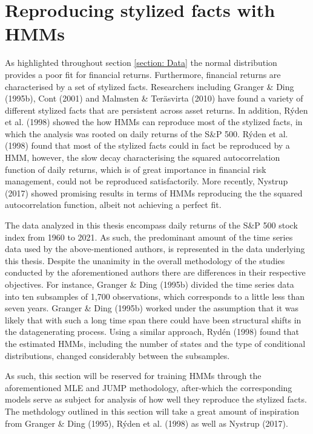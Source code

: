 \newpage

\section{Reproducing stylized facts with HMMs}
\label{Section: Stylized facts}
As highlighted throughout section \ref{section: Data} the normal distribution provides a poor fit for financial returns. Furthermore, financial returns are characterised by a set of stylized facts. Researchers including Granger \& Ding (1995b), Cont (2001) and Malmsten \& Teräsvirta (2010) have found a variety of different stylized facts that are persistent across asset returns. In addition, Rýden et al. (1998) showed the how HMMs can reproduce most of the stylized facts, in which the analysis was rooted on daily returns of the S\&P 500. Rýden et al. (1998) found that most of the stylized facts could in fact be reproduced by a HMM, however, the slow decay characterising the  squared autocorrelation function of daily returns, which is of great importance in financial risk management, could not be reproduced satisfactorily. More recently, Nystrup (2017) showed promising results in terms of HMMs reproducing the the squared autocorrelation function, albeit not achieving a perfect fit. 

The data analyzed in this thesis encompass daily returns of the S\&P 500 stock index from 1960 to 2021. As such, the predominant amount of the time series data used by the above-mentioned authors, is represented in the data underlying this thesis. Despite the unanimity in the overall methodology of the studies conducted by the aforementioned authors there are differences in their respective objectives. For instance, Granger \& Ding (1995b) divided the time series data into ten subsamples of 1,700 observations, which corresponds to a little less than seven years. Granger \& Ding (1995b) worked under the assumption that it was likely that with such a long time span there could have been structural shifts in the datagenerating process. Using a similar approach, Rydén (1998) found that the estimated HMMs, including the number of states and the type of conditional distributions, changed considerably between the subsamples.

As such, this section will be reserved for training HMMs through the aforementioned MLE and JUMP methodology, after-which the corresponding models serve as subject for analysis of how well they reproduce the stylized facts. The methdology outlined in this section will take a great amount of inspiration from Granger \& Ding (1995), Rýden et al. (1998) as well as Nystrup (2017).

